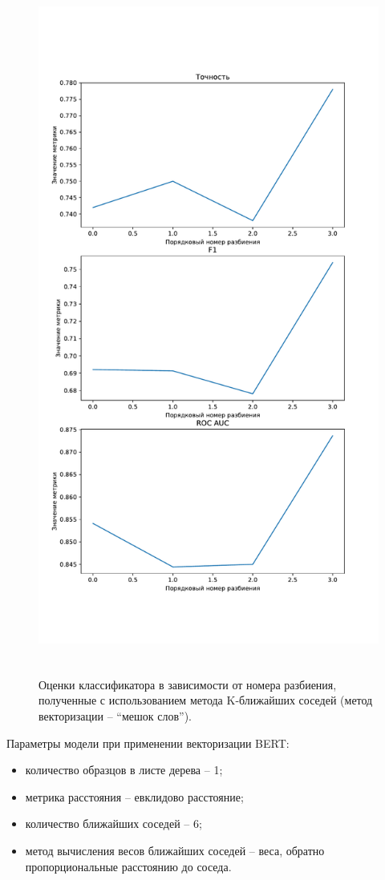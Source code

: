 \begin{figure}[H]
	\centering
	\includegraphics[height=23cm]{inc/plots/knnMetricsBag.pdf}
	\caption{ Оценки классификатора в зависимости от номера разбиения, полученные с использованием метода K-ближайших соседей (метод векторизации --  ``мешок слов''). }
	\label{img:knnMetricsBag}
\end{figure}


Параметры модели при применении векторизации BERT:
\begin{itemize}
	\item количество образцов в листе дерева -- 1;
	\item метрика расстояния -- евклидово расстояние;
	\item количество ближайших соседей -- 6;
	\item метод вычисления весов ближайших соседей -- веса, обратно пропорциональные расстоянию до соседа.
\end{itemize}


